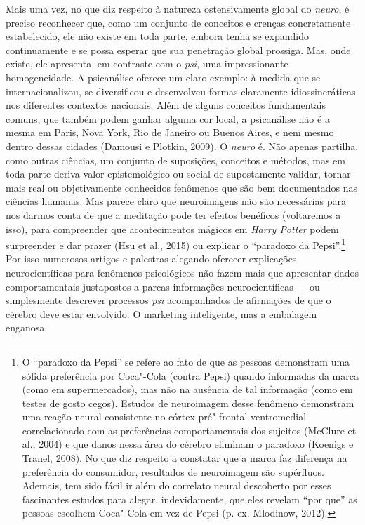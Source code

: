 Mais uma vez, no que diz respeito à natureza ostensivamente global do
\emph{neuro}, é preciso reconhecer que, como um conjunto de conceitos e
crenças concretamente estabelecido, ele não existe em toda parte, embora
tenha se expandido continuamente e se possa esperar que sua penetração
global prossiga. Mas, onde existe, ele apresenta, em contraste com o
\emph{psi}, uma impressionante homogeneidade. A psicanálise oferece um
claro exemplo: à medida que se internacionalizou, se diversificou e
desenvolveu formas claramente idiossincráticas nos diferentes contextos
nacionais. Além de alguns conceitos fundamentais comuns, que também
podem ganhar alguma cor local, a psicanálise não é a mesma em Paris,
Nova York, Rio de Janeiro ou Buenos Aires, e nem mesmo dentro dessas
cidades (Damousi e Plotkin, 2009). O \emph{neuro} é. Não apenas
partilha, como outras ciências, um conjunto de suposições, conceitos e
métodos, mas em toda parte deriva valor epistemológico ou social de
supostamente validar, tornar mais real ou objetivamente conhecidos
fenômenos que são bem documentados nas ciências humanas. Mas parece
claro que neuroimagens não são necessárias para nos darmos conta de que
a meditação pode ter efeitos benéficos (voltaremos a isso), para
compreender que acontecimentos mágicos em \emph{Harry Potter} podem
surpreender e dar prazer (Hsu et al., 2015) ou explicar o ``paradoxo da
Pepsi''.\footnote[8]{O ``paradoxo da Pepsi'' se refere ao fato de que as pessoas
demonstram uma sólida preferência por Coca"-Cola (contra Pepsi) quando
informadas da marca (como em supermercados), mas não na ausência de tal
informação (como em testes de gosto cegos). Estudos de neuroimagem desse
fenômeno demonstram uma reação neural consistente no córtex pré"-frontal
ventromedial correlacionado com as preferências comportamentais dos
sujeitos (McClure et al., 2004) e que danos nessa área do cérebro
eliminam o paradoxo (Koenigs e Tranel, 2008). No que diz respeito a
constatar que a marca faz diferença na preferência do consumidor,
resultados de neuroimagem são supérfluos. Ademais, tem sido fácil ir
além do correlato neural descoberto por esses fascinantes estudos para
alegar, indevidamente, que eles revelam ``por que'' as pessoas escolhem
Coca"-Cola em vez de Pepsi (p. ex. Mlodinow, 2012).} Por isso numerosos artigos e palestras
alegando oferecer explicações neurocientíficas para fenômenos
psicológicos não fazem mais que apresentar dados comportamentais justapostos
a parcas informações neurocientíficas --- ou simplesmente descrever
processos \emph{psi} acompanhados de afirmações de que o cérebro deve
estar envolvido. O marketing inteligente, mas a embalagem enganosa.

